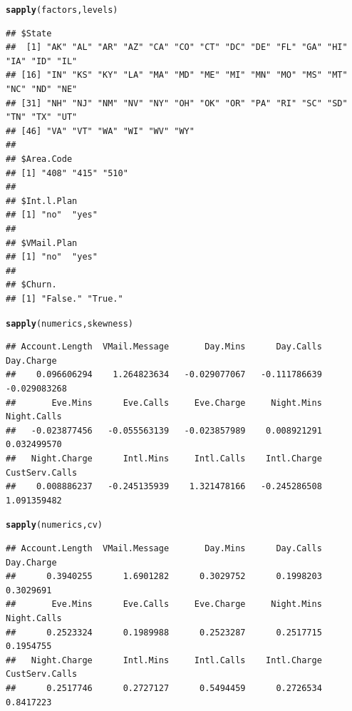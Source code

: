 \documentclass{article}\usepackage[]{graphicx}\usepackage[]{color}
\makeatletter
\newcommand{\hlstd}[1]{\textcolor[rgb]{0.345,0.345,0.345}{#1}}%
\newcommand{\hlkwd}[1]{\textcolor[rgb]{0.737,0.353,0.396}{\textbf{#1}}}%
\newenvironment{kframe}{%
 \def\at@end@of@kframe{}%
 \ifinner\ifhmode%
  \def\at@end@of@kframe{\end{minipage}}%
  \begin{minipage}{\columnwidth}%
 \fi\fi%
 \def\FrameCommand##1{\hskip\@totalleftmargin \hskip-\fboxsep
 \colorbox{shadecolor}{##1}\hskip-\fboxsep
     \hskip-\linewidth \hskip-\@totalleftmargin \hskip\columnwidth}%
 \MakeFramed {\advance\hsize-\width
   \@totalleftmargin\z@ \linewidth\hsize
   \@setminipage}}%
 {\par\unskip\endMakeFramed%
 \at@end@of@kframe}
\newenvironment{knitrout}{}{} %
\makeatother
\begin{document}
\begin{description}
\begin{knitrout}
\color{fgcolor}\begin{kframe}
\begin{alltt}
\hlkwd{sapply}\hlstd{(factors, levels)}
\end{alltt}
\begin{verbatim}
## $State
##  [1] "AK" "AL" "AR" "AZ" "CA" "CO" "CT" "DC" "DE" "FL" "GA" "HI" "IA" "ID" "IL"
## [16] "IN" "KS" "KY" "LA" "MA" "MD" "ME" "MI" "MN" "MO" "MS" "MT" "NC" "ND" "NE"
## [31] "NH" "NJ" "NM" "NV" "NY" "OH" "OK" "OR" "PA" "RI" "SC" "SD" "TN" "TX" "UT"
## [46] "VA" "VT" "WA" "WI" "WV" "WY"
## 
## $Area.Code
## [1] "408" "415" "510"
## 
## $Int.l.Plan
## [1] "no"  "yes"
## 
## $VMail.Plan
## [1] "no"  "yes"
## 
## $Churn.
## [1] "False." "True."
\end{verbatim}
\end{kframe}
\end{knitrout}

\begin{knitrout}
\color{fgcolor}\begin{kframe}
\begin{alltt}
\hlkwd{sapply}\hlstd{(numerics, skewness)}
\end{alltt}
\begin{verbatim}
## Account.Length  VMail.Message       Day.Mins      Day.Calls     Day.Charge 
##    0.096606294    1.264823634   -0.029077067   -0.111786639   -0.029083268 
##       Eve.Mins      Eve.Calls     Eve.Charge     Night.Mins    Night.Calls 
##   -0.023877456   -0.055563139   -0.023857989    0.008921291    0.032499570 
##   Night.Charge      Intl.Mins     Intl.Calls    Intl.Charge CustServ.Calls 
##    0.008886237   -0.245135939    1.321478166   -0.245286508    1.091359482
\end{verbatim}
\begin{alltt}
\hlkwd{sapply}\hlstd{(numerics, cv)}
\end{alltt}
\begin{verbatim}
## Account.Length  VMail.Message       Day.Mins      Day.Calls     Day.Charge 
##      0.3940255      1.6901282      0.3029752      0.1998203      0.3029691 
##       Eve.Mins      Eve.Calls     Eve.Charge     Night.Mins    Night.Calls 
##      0.2523324      0.1989988      0.2523287      0.2517715      0.1954755 
##   Night.Charge      Intl.Mins     Intl.Calls    Intl.Charge CustServ.Calls 
##      0.2517746      0.2727127      0.5494459      0.2726534      0.8417223
\end{verbatim}
\end{kframe}
\end{knitrout}

\end{description}
\end{document}
